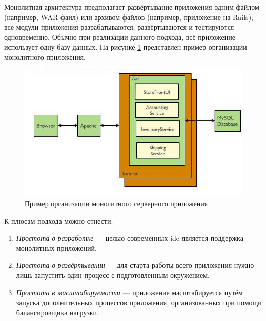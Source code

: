 \subsubsection {}
\label{sec:analysis:research:backArch:monolith}

Монолитная архитектура предполагает развёртывание приложения одним файлом (например, WAR фаил) или архивом файлов (например, приложение на Rails), все модули приложения разрабатываются, развёртываются и тестируются одновременно. Обычно при реализации данного подхода, всё приложение использует одну базу данных. На рисунке \ref{sec:analysis:research:arch:back:monolith} представлен пример организации монолитного приложения. \cite{microservices:ma}

\begin{figure}[h]
  \centering
    \includegraphics[width=1\textwidth]{inc/img/backend-monolith.jpg}
  \caption{Пример организации монолитного серверного приложения}
  \label{sec:analysis:research:arch:back:monolith}
\end{figure}

К плюсам подхода можно отнести:

\begin{enumerate}
	\item \emph{Простота в разработке} --- целью современных \gls{ide} является поддержка монолитных приложений.
	\item \emph{Простота в развёртывании} --- для старта работы всего приложения нужно лишь запустить один процесс с подготовленным окружением.
	\item \emph{Простота в масштабируемости} --- приложение масштабируется путём запуска дополнительных процессов приложения, организованных при помощи балансировщика нагрузки.
\end{enumerate}

